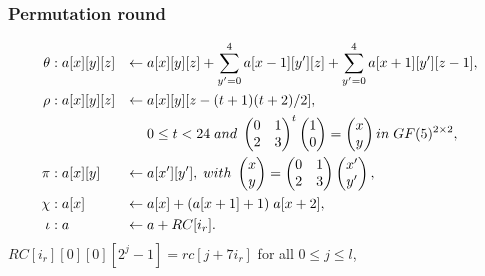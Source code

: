 \documentclass{beamer}
\begin{document}
\begin{frame}
\frametitle{Permutation round}
\vspace{-\baselineskip}
\begin{adjustwidth}{-1.5em}{-1.5em}
\begin{align*}
  \theta &: a[x][y][z] & \gets & \thickspace a[x][y][z] + \displaystyle\sum\limits_{y' = 0}^{4} a[x - 1][y'][z] + \displaystyle\sum\limits_{y' = 0}^{4} a[x + 1][y'][z - 1], \\
  \rho &: a[x][y][z] & \gets & \thickspace a[x][y][z - (t + 1)(t + 2) / 2], \\
  & & & \thickspace 0 \leq t < 24 \thickspace and \thickspace
  \begin{pmatrix} 0 & 1 \\ 2 & 3 \end{pmatrix}^{t} \begin{pmatrix} 1 \\ 0 \end{pmatrix} = \begin{pmatrix} x \\ y \end{pmatrix}
  in \thickspace GF(5)^{2 \times 2}, \\
  \pi &: a[x][y] & \gets & \thickspace a[x'][y'], \thickspace with \thickspace
  \begin{pmatrix} x \\ y \end{pmatrix} = \begin{pmatrix} 0 & 1 \\ 2 & 3 \end{pmatrix} \begin{pmatrix} x' \\ y'\end{pmatrix}, \\
  \chi &: a[x] & \gets & \thickspace a[x] + (a[x + 1] + 1) \thickspace a[x + 2], \\
  \iota &: a & \gets & \thickspace a + RC[i_{r}].
\end{align*}
$RC[i_{r}][0][0][2^{j} - 1] = rc[j + 7i_{r}]$ for all $ 0 \leq j \leq l$,
\end{adjustwidth}
\end{frame}

\end{document}
